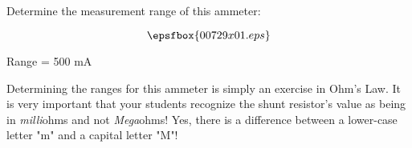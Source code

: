 

Determine the measurement range of this ammeter:

$$\epsfbox{00729x01.eps}$$







Range = 500 mA







Determining the ranges for this ammeter is simply an exercise in Ohm's Law.  It is very important that your students recognize the shunt resistor's value as being in {\it milli}ohms and not {\it Mega}ohms!  Yes, there is a difference between a lower-case letter "m" and a capital letter "M"!



